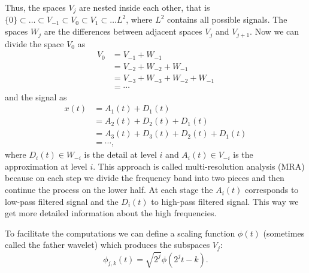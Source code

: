 Thus, the spaces $V_j$ are nested inside each other, that is $\{0\} \subset \ldots \subset V_{-1} \subset V_{0} \subset V_{1} \subset \ldots L^2$, where $L^2$ contains all possible signals. The spaces $W_j$ are the differences between adjacent spaces $V_j$ and $V_{j+1}$. Now we can divide the space $V_0$ as
\begin{align*}
V_0 &= V_{-1} + W_{-1} \\
&= V_{-2} + W_{-2} + W_{-1} \\
&= V_{-3} + W_{-3} + W_{-2} + W_{-1} \\
&= \cdots
\end{align*}
and the signal as
\begin{align}
x(t) &= A_1(t) + D_1(t) \label{eq:decomposition} \\
&= A_2(t) + D_2(t) + D_1(t) \\
&= A_3(t) + D_3(t) + D_2(t) + D_1(t) \\
&= \cdots,
\end{align}
where $D_i(t) \in W_{-i}$ is the detail at level $i$ and $A_i(t) \in V_{-i}$ is the approximation at level $i$. This approach is called multi-resolution analysis (MRA) because on each step we divide the frequency band into two pieces and then continue the process on the lower half. At each stage the $A_i(t)$ corresponds to low-pass filtered signal and the $D_i(t)$ to high-pass filtered signal. This way we get more detailed information about the high frequencies. \cite{Phillips03} 

To facilitate the computations we can define a scaling function $\phi(t)$ (sometimes called the father wavelet) which produces the subspaces $V_j$:
\begin{equation}
\phi_{j,k}(t) = \sqrt{2^j} \phi(2^j t - k).
\end{equation}

